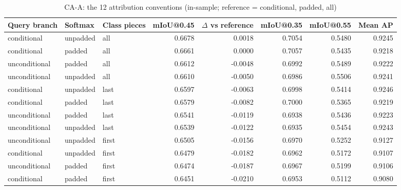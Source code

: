 \begin{table}[H]\centering\scriptsize\setlength{\tabcolsep}{3pt}
\begin{tabular}{>{\raggedright\arraybackslash}p{2.09cm}>{\raggedright\arraybackslash}p{1.49cm}>{\raggedright\arraybackslash}p{1.98cm}rrrrr}
\toprule
Query branch & Softmax & Class pieces & mIoU@0.45 & $\Delta$ vs reference & mIoU@0.35 & mIoU@0.55 & Mean AP \\
\midrule
conditional & unpadded & all & 0.6678 & 0.0018 & 0.7054 & 0.5480 & 0.9245 \\
conditional & padded & all & 0.6661 & 0.0000 & 0.7057 & 0.5435 & 0.9218 \\
unconditional & padded & all & 0.6612 & -0.0048 & 0.6992 & 0.5489 & 0.9222 \\
unconditional & unpadded & all & 0.6610 & -0.0050 & 0.6986 & 0.5506 & 0.9241 \\
conditional & unpadded & last & 0.6597 & -0.0063 & 0.6998 & 0.5414 & 0.9246 \\
conditional & padded & last & 0.6579 & -0.0082 & 0.7000 & 0.5365 & 0.9219 \\
unconditional & padded & last & 0.6541 & -0.0119 & 0.6938 & 0.5436 & 0.9223 \\
unconditional & unpadded & last & 0.6539 & -0.0122 & 0.6935 & 0.5454 & 0.9243 \\
unconditional & unpadded & first & 0.6505 & -0.0156 & 0.6970 & 0.5252 & 0.9127 \\
conditional & unpadded & first & 0.6479 & -0.0182 & 0.6962 & 0.5172 & 0.9107 \\
unconditional & padded & first & 0.6474 & -0.0187 & 0.6967 & 0.5199 & 0.9106 \\
conditional & padded & first & 0.6451 & -0.0210 & 0.6953 & 0.5112 & 0.9080 \\
\bottomrule
\end{tabular}
\caption{CA-A: the 12 attribution conventions (in-sample; reference = conditional, padded, all)}\label{tab:a1_ca_a}
\end{table}
